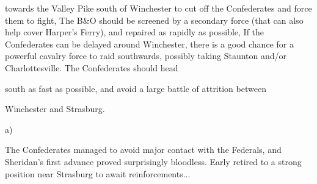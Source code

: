 towards the Valley Pike south of Winchester to cut off the Confederates and force them to fight, The B\&O should be screened by a secondary force (that can also help cover Harper's Ferry), and repaired as rapidly as possible, If the Confederates can be delayed around Winchester, there is a good chance for a powerful cavalry force to raid southwards, possibly taking Staunton and/or Charlottesville. The Confederates should head

\begin{scenariodata}
south as fast as possible, and avoid a large battle of attrition between\\
\end{scenariodata}

Winchester and Strasburg.

a)

The Confederates managed to avoid major contact with the Federals, and Sheridan's first advance proved surprisingly bloodless. Early retired to a strong position near Strasburg to await reinforcements...

